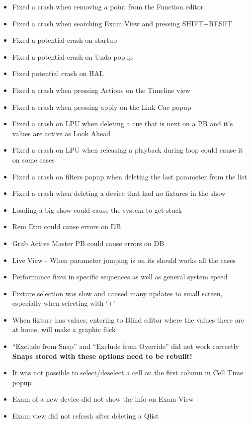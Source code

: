 \documentclass[
]{article}
\begin{document}
\begin{itemize}
\item
  Fixed a crash when removing a point from the Function editor
\item
  Fixed a crash when searching Exam View and pressing SHIFT+RESET
\item
  Fixed a potential crash on startup
\item
  Fixed a potential crash on Undo popup
\item
  Fixed potential crash on HAL
\item
  Fixed a crash when pressing Actions on the Timeline view
\item
  Fixed a crash when pressing apply on the Link Cue popup
\item
  Fixed a crash on LPU when deleting a cue that is next on a PB and it's values are active as Look Ahead
\item
  Fixed a crash on LPU when releasing a playback during loop could cause it on some cases
\item
  Fixed a crash on filters popup when deleting the last parameter from the list
\item
  Fixed a crash when deleting a device that had no fixtures in the show
\item
  Loading a big show could cause the system to get stuck
\item
  Rem Dim could cause errors on DB
\item
  Grab Active Master PB could cause errors on DB
\item
  Live View - When parameter jumping is on its should works all the cases
\item
  Performance fixes in specific sequences as well as general system speed
\item
  Fixture selection was slow and caused many updates to small screen, especially when selecting with `+'
\item
  When fixture has values, entering to Blind editor where the values there are at home, will make a graphic flick
\item
  ``Exclude from Snap'' and ``Exclude from Override'' did not work correctly \textbf{Snaps stored with these options need to be rebuilt!}
\item
  It was not possible to select/deselect a cell on the first column in Cell Time popup
\item
  Exam of a new device did not show the info on Exam View
\item
  Exam view did not refresh after deleting a Qlist

\end{itemize}
\end{document}
